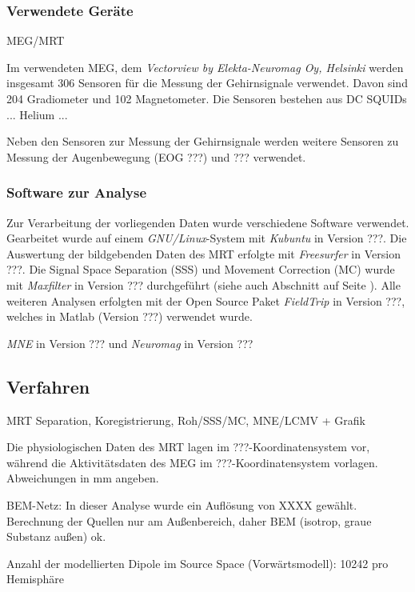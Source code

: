 \documentclass[doc,a4paper,12pt]{apa6}
\makeatletter
\DeclareRobustCommand*{\nameref}[1]{%
      \glqq{\myorg@nameref{#1}}\grqq%
    }%
\makeatother
\begin{document}
\subsubsection{Verwendete Geräte}

MEG/MRT

Im verwendeten MEG, dem \emph{Vectorview by Elekta-Neuromag Oy, Helsinki} werden insgesamt 306 Sensoren für die Messung der Gehirnsignale verwendet. Davon sind 204 Gradiometer und 102 Magnetometer. Die Sensoren bestehen aus DC SQUIDs ... Helium ...

Neben den Sensoren zur Messung der Gehirnsignale werden weitere Sensoren zu Messung der Augenbewegung (EOG ???) und ??? verwendet.

\subsubsection{Software zur Analyse}
\label{sec:software}

Zur Verarbeitung der vorliegenden Daten wurde verschiedene Software verwendet. Gearbeitet wurde auf einem \emph{GNU/Linux}-System mit \emph{Kubuntu} in Version ???. Die Auswertung der bildgebenden Daten des MRT erfolgte mit \emph{Freesurfer} in Version ???. Die Signal Space Separation (SSS) und Movement Correction (MC) wurde mit \emph{Maxfilter} in Version ??? durchgeführt (siehe auch Abschnitt \nameref{sec:maxfilter} auf Seite \pageref{sec:maxfilter}). Alle weiteren Analysen erfolgten mit der Open Source Paket \emph{FieldTrip} in Version ???, welches in Matlab (Version ???) verwendet wurde.

\emph{MNE} in Version ??? und \emph{Neuromag} in Version ??? 

\subsection{Verfahren}

MRT Separation, Koregistrierung, Roh/SSS/MC, MNE/LCMV + Grafik

Die physiologischen Daten des MRT lagen im ???-Koordinatensystem vor, während die Aktivitätsdaten des MEG im ???-Koordinatensystem vorlagen. Abweichungen in mm angeben.

BEM-Netz: In dieser Analyse wurde ein Auflösung von XXXX gewählt.
Berechnung der Quellen nur am Außenbereich, daher BEM (isotrop, graue Substanz außen) ok.

Anzahl der modellierten Dipole im Source Space (Vorwärtsmodell): 10242 pro Hemisphäre
\end{document}
